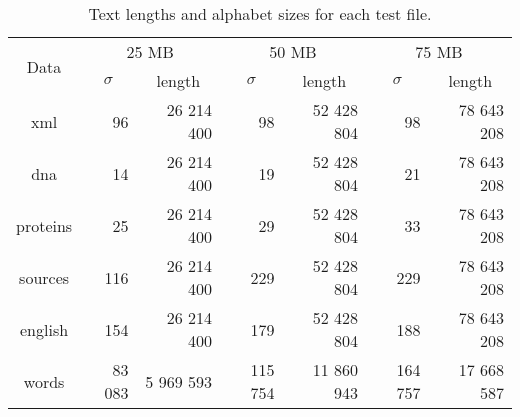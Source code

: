 \begin{center}
\begin{table}[h]
\begin{tabular}{crrrrrr}
\toprule
\multirow{2}{*}{Data} & \multicolumn{2}{c}{25 MB} & \multicolumn{2}{c}{50 MB} &  
	\multicolumn{2}{c}{75 MB}\\
		  \cmidrule(r){2-7}
	      &\multicolumn{1}{c}{$\sigma$}& \multicolumn{1}{c}{length}
		  &\multicolumn{1}{c}{$\sigma$}&\multicolumn{1}{c}{length}
		  &\multicolumn{1}{c}{$\sigma$}&\multicolumn{1}{c}{length}\\
\midrule
xml 	  & 96	   & 26 214 400 & 98 	   & 52 428 804 & 98 	   & 78 643 208 \\
dna 	  & 14     & 26 214 400 & 19 	   & 52 428 804 & 21     & 78 643 208 \\
proteins  & 25     & 26 214 400 & 29     & 52 428 804 & 33     & 78 643 208 \\
sources   & 116    & 26 214 400 & 229    & 52 428 804 & 229    & 78 643 208 \\
english   & 154    & 26 214 400 & 179    & 52 428 804 & 188    & 78 643 208 \\
words     & 83 083  & 5 969 593  & 115 754 & 11 860 943 & 164 757 & 17 668 587 \\
\bottomrule
\end{tabular}
\caption{Text lengths and alphabet sizes for each test file.}
\label{tab:files}
\end{table}
\end{center}
